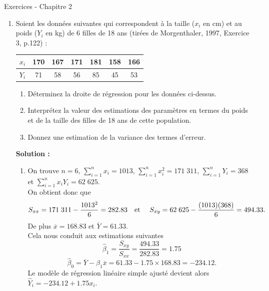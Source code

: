 \documentclass[letter, 11pt]{article}
\newcommand{\prof}[1]{\begin{professeur}\color{blue} {\bf Solution :} #1 \end{professeur}}
\begin{document}
\vspace*{0.01 cm}
\begin{center}
{\Large Exercices - Chapitre 2}
\end{center}



\begin{enumerate}[leftmargin=*, wide, label=\bf Exercice \arabic*:]
\item
Soient les données suivantes qui correspondent à la taille ($x_i$ en cm) et au poids ($Y_i$ en kg) de 6 filles de 18 ans (tirées de Morgenthaler, 1997, Exercice 3, p.122) :

\begin{center}
\begin{tabular}{|c|c|c|c|c|c|c|}
\hline
$x_i$ & 170 & 167 & 171 & 181 & 158 & 166 \\\hline
$Y_i$ & 71 & 58 & 56 & 85 & 45 & 53\\\hline
\end{tabular}
\end{center}

\begin{enumerate}[label={\bf \alph*)}] 
\item Déterminez la droite de régression pour les données ci-dessus.
\item  Interprétez la valeur des estimations des paramètres en termes du poids et de la taille des filles de 18 ans de cette population.
\item  Donnez une estimation de la variance des termes d’erreur.
\end{enumerate}

\prof{\begin{enumerate}[label={\bf \alph*)}]
\item  On trouve $n = 6$, $\sum_{i=1}^n x_i = 1013$, $\sum_{i=1}^n x_i^2 = 171\;311$, $\sum_{i=1}^n Y_i = 368$ et $\sum_{i=1}^n x_iY_i = 62\;625$.\\
 On obtient donc que
    $$
    S_{xx} = 171\;311-\frac{1013^2}{6} = 282.83 \text{\quad et \quad} S_{xy} = 62\;625 -\frac{(1013)(368)}{6} = 494.33.
    $$
    De plus $\overline{x}= 168.83$ et $\overline{Y}= 61.33$. \\
		Cela nous conduit aux estimations suivantes $$\hat{\beta}_1= \frac{S_{xy}}{S_{xx}} = \frac{494.33}{282.83} = 1.75$$ $$\hat{\beta}_0 = \overline{Y} - \hat{\beta}_1\overline{x} = 61.33 - 1.75\times168.83 = -234.12.$$
		Le modèle de régression linéaire simple ajusté devient alors $\hat{Y}_i = -234.12 + 1.75x_i$.\\


\end{enumerate}}
\end{enumerate}
\end{document}
